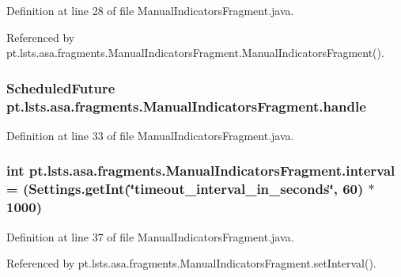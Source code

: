 Definition at line 28 of file Manual\+Indicators\+Fragment.\+java.



Referenced by pt.\+lsts.\+asa.\+fragments.\+Manual\+Indicators\+Fragment.\+Manual\+Indicators\+Fragment().

\hypertarget{classpt_1_1lsts_1_1asa_1_1fragments_1_1ManualIndicatorsFragment_a6e87785cb23b08623969ad121c81875e}{}
\subsubsection[{handle}]{\setlength{\rightskip}{0pt plus 5cm}Scheduled\+Future pt.\+lsts.\+asa.\+fragments.\+Manual\+Indicators\+Fragment.\+handle\hspace{0.3cm}{\ttfamily [private]}}\label{classpt_1_1lsts_1_1asa_1_1fragments_1_1ManualIndicatorsFragment_a6e87785cb23b08623969ad121c81875e}


Definition at line 33 of file Manual\+Indicators\+Fragment.\+java.

\hypertarget{classpt_1_1lsts_1_1asa_1_1fragments_1_1ManualIndicatorsFragment_a5c9aaf2da9fdecdc1e8544ac75e00a91}{}
\subsubsection[{interval}]{\setlength{\rightskip}{0pt plus 5cm}int pt.\+lsts.\+asa.\+fragments.\+Manual\+Indicators\+Fragment.\+interval = ({\bf Settings.\+get\+Int}(\char`\"{}timeout\+\_\+interval\+\_\+in\+\_\+seconds\char`\"{}, 60) $\ast$ 1000)\hspace{0.3cm}{\ttfamily [private]}}\label{classpt_1_1lsts_1_1asa_1_1fragments_1_1ManualIndicatorsFragment_a5c9aaf2da9fdecdc1e8544ac75e00a91}


Definition at line 37 of file Manual\+Indicators\+Fragment.\+java.



Referenced by pt.\+lsts.\+asa.\+fragments.\+Manual\+Indicators\+Fragment.\+set\+Interval().

